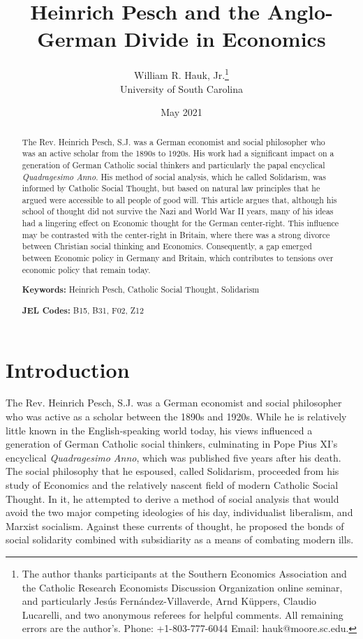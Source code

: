 \documentclass{article}
\title{Heinrich Pesch and the Anglo-German Divide in Economics}
\author{William R. Hauk, Jr.\thanks{The author thanks participants at the Southern Economics Association and the Catholic Research Economists Discussion Organization online seminar, and particularly Jes\'{u}s Fern\'{a}ndez-Villaverde, Arnd K\"{u}ppers, Claudio Lucarelli, and two anonymous referees for helpful comments.  All remaining errors are the author's.  Phone:  +1-803-777-6044  Email:  hauk@moore.sc.edu.}\\University of South Carolina}
\date{May 2021}
\begin{document}
\maketitle

\doublespacing
\begin{abstract}
The Rev. Heinrich Pesch, S.J. was a German economist and social philosopher who was an active scholar from the 1890s to 1920s.  His work had a significant impact on a generation of German Catholic social thinkers and particularly the papal encyclical \emph{Quadragesimo Anno}.  His method of social analysis, which he called Solidarism, was informed by Catholic Social Thought, but based on natural law principles that he argued were accessible to all people of good will.  This article argues that, although his school of thought did not survive the Nazi and World War II years, many of his ideas had a lingering effect on Economic thought for the German center-right.  This influence may be contrasted with the center-right in Britain, where there was a strong divorce between Christian social thinking and Economics.  Consequently, a gap emerged between Economic policy in Germany and Britain, which contributes to tensions over economic policy that remain today.

\textbf{Keywords:}  Heinrich Pesch, Catholic Social Thought, Solidarism

\textbf{JEL Codes:}  B15, B31, F02, Z12

\end{abstract}

\section{Introduction}

The Rev. Heinrich Pesch, S.J. was a German economist and social philosopher who was active as a scholar between the 1890s and 1920s.  While he is relatively little known in the English-speaking world today, his views influenced a generation of German Catholic social thinkers, culminating in Pope Pius XI’s encyclical \emph{Quadragesimo Anno}, which was published five years after his death.  The social philosophy that he espoused, called Solidarism, proceeded from his study of Economics and the relatively nascent field of modern Catholic Social Thought.  In it, he attempted to derive a method of social analysis that would avoid the two major competing ideologies of his day, individualist liberalism, and Marxist socialism.  Against these currents of thought, he proposed the bonds of social solidarity combined with subsidiarity as a means of combating modern ills.\medskip
\end{document}
